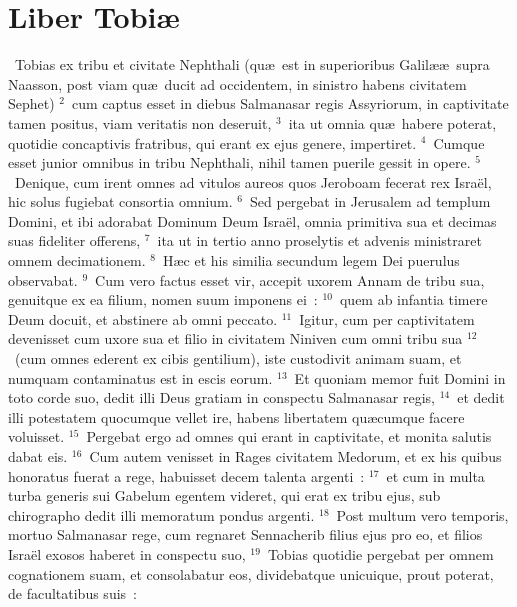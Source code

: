 {\centering \section*{Liber Tobiæ}}\thispagestyle{empty}

~\lettrine[lines=10,image=true,loversize=0.05,lraise=-0.03]{T}{}obias ex tribu et civitate Nephthali (qu\ae\ est in superioribus Galil\ae \ae\ supra Naasson, post viam qu\ae\ ducit ad occidentem, in sinistro habens civitatem Sephet)
${}^{2}$~cum captus esset in diebus Salmanasar regis Assyriorum, in captivitate tamen positus, viam veritatis non deseruit,
${}^{3}$~ita ut omnia qu\ae\ habere poterat, quotidie concaptivis fratribus, qui erant ex ejus genere, impertiret.
${}^{4}$~Cumque esset junior omnibus in tribu Nephthali, nihil tamen puerile gessit in opere.
${}^{5}$~Denique, cum irent omnes ad vitulos aureos quos Jeroboam fecerat rex Isra\"el, hic solus fugiebat consortia omnium.
${}^{6}$~Sed pergebat in Jerusalem ad templum Domini, et ibi adorabat Dominum Deum Isra\"el, omnia primitiva sua et decimas suas fideliter offerens,
${}^{7}$~ita ut in tertio anno proselytis et advenis ministraret omnem decimationem.
${}^{8}$~H\ae c et his similia secundum legem Dei puerulus observabat.
${}^{9}$~Cum vero factus esset vir, accepit uxorem Annam de tribu sua, genuitque ex ea filium, nomen suum imponens ei~:
${}^{10}$~quem ab infantia timere Deum docuit, et abstinere ab omni peccato.
${}^{11}$~Igitur, cum per captivitatem devenisset cum uxore sua et filio in civitatem Niniven cum omni tribu sua
${}^{12}$~(cum omnes ederent ex cibis gentilium), iste custodivit animam suam, et numquam contaminatus est in escis eorum.
${}^{13}$~Et quoniam memor fuit Domini in toto corde suo, dedit illi Deus gratiam in conspectu Salmanasar regis,
${}^{14}$~et dedit illi potestatem quocumque vellet ire, habens libertatem qu\ae cumque facere voluisset.
${}^{15}$~Pergebat ergo ad omnes qui erant in captivitate, et monita salutis dabat eis.
${}^{16}$~Cum autem venisset in Rages civitatem Medorum, et ex his quibus honoratus fuerat a rege, habuisset decem talenta argenti~:
${}^{17}$~et cum in multa turba generis sui Gabelum egentem videret, qui erat ex tribu ejus, sub chirographo dedit illi memoratum pondus argenti.
${}^{18}$~Post multum vero temporis, mortuo Salmanasar rege, cum regnaret Sennacherib filius ejus pro eo, et filios Isra\"el exosos haberet in conspectu suo,
${}^{19}$~Tobias quotidie pergebat per omnem cognationem suam, et consolabatur eos, dividebatque unicuique, prout poterat, de facultatibus suis~:

